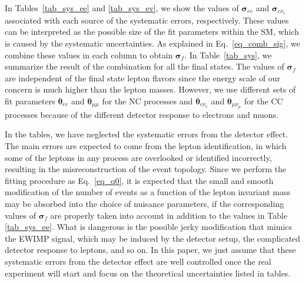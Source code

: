 \documentclass[12pt,twoside,book]{article}
\begin{document}
In Tables~\ref{tab_sys_ee} and \ref{tab_sys_ev}, we show the values of
$\bm{\sigma}_{ee}$ and $\bm{\sigma}_{e\nu_e}$ associated with each
source of the systematic errors, respectively.  These values can be
interpreted as the possible size of the fit parameters within the SM,
which is caused by the systematic uncertainties.  As explained in
Eq.~\eqref{eq_comb_sig}, we combine these values in each column to
obtain $\bm{\sigma}_f$.  In Table~\ref{tab_sys}, we summarize the
result of the combination for all the final states.  The values of
$\bm{\sigma}_f$ are independent of the final state lepton flavors
since the energy scale of our concern is much higher than the lepton
masses.  However, we use different sets of fit parameters
$\bm{\theta}_{ee}$ and $\bm{\theta}_{\mu\mu}$ for the NC processes and
$\bm{\theta}_{e\nu_e}$ and $\bm{\theta}_{\mu\nu_\mu}$ for the CC
processes because of the different detector response to electrons and
muons.

In the tables, we have neglected the systematic errors from the
detector effect.  The main errors are expected to come from the lepton
identification, in which some of the leptons in any process are
overlooked or identified incorrectly, resulting in the
misreconstruction of the event topology.  Since we perform the fitting
procedure as Eq.~\eqref{eq_q0}, it is expected that the small and
smooth modification of the number of events as a function of the
lepton invariant mass may be absorbed into the choice of nuisance
parameters, if the corresponding values of $\bm{\sigma}_f$ are
properly taken into account in addition to the values in Table
\ref{tab_sys_ee}.  What is dangerous is the possible jerky
modification that mimics the EWIMP signal, which may be induced by the
detector setup, the complicated detector response to leptons, and so
on.  %
In this paper, we just assume that these systematic
errors from the detector effect are well controlled once the real
experiment will start and focus on the theoretical uncertainties
listed in tables.

\end{document}

